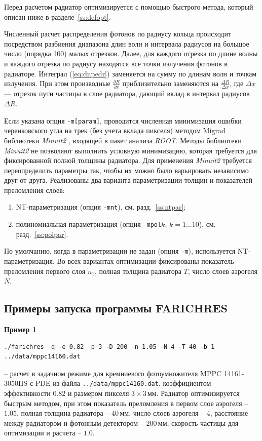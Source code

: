 \documentclass[12pt]{article}
\begin{document}
Перед расчетом радиатор оптимизируется с помощью быстрого метода, который описан ниже в разделе~\ref{ss:defopt}.

Численный расчет распределения фотонов по радиусу кольца происходит посредством разбиения диапазона длин волн и интервала 
радиусов на большое число (порядка 100) малых отрезков. Далее, для каждого отрезка по длине волны и каждого отрезка по радиусу находятся 
все точки излучения фотонов в радиаторе. Интеграл (\ref{eq:dnpedr}) заменяется на сумму по длинам волн и точкам излучения.
При этом производные $\frac{\partial R}{\partial x}$ приблизительно заменяются на $\frac{\Delta R}{\Delta x}$, где $\Delta x$ --- отрезок пути частицы в слое радиатора, дающий вклад в интервал радиусов $\Delta R$.

Если указана опция {\tt -m[param]}, проводится численная минимизация ошибки черенковского угла на трек (без учета вклада пикселя) 
методом Migrad библиотеки {\em Minuit2} \cite{minuit2}, входящей в пакет анализа {\em ROOT}. Методы библиотеки {\em Minuit2} не 
позволяют выполнить условную минимизацию, которая требуется для фиксированной полной толщины радиатора. 
Для применения {\em Minuit2} требуется переопределить параметры так, чтобы их можно было варьировать независимо друг от друга.
Реализованы два варианта параметризации толщин и показателей преломления слоев:
\begin{enumerate}
\item NT-параметризация (опция {\tt -mnt}), см. разд.~\ref{ss:ntpar};
\item полиномиальная параметризация (опция {\tt -mpol$k$}, $k=1\ldots 10$), см. разд.~\ref{ss:polpar}.
\end{enumerate}
По умолчанию, когда в параметризации не задан (опция {\tt -m}), используется NT-параметризация.
Во всех вариантах оптимизации фиксированы показатель преломления первого слоя $n_1$, полная толщина радиатора $T$, число слоев аэрогеля $N$.

\subsection{Примеры запуска программы FARICHRES}
\label{ss:examples}
\vspace*{5mm}
\textbf{Пример 1}
{\small
\begin{verbatim}
./farichres -q -e 0.82 -p 3 -D 200 -n 1.05 -N 4 -T 40 -b 1 ../data/mppc14160.dat
\end{verbatim}}
\noindent
-- расчет в задачном режиме для кремниевого фотоумножителя MPPC 14161-3050HS с PDE из файла \texttt{../data/mppc14160.dat},
коэффициентом эффективности $0.82$ и размером пикселя $3\times 3$\,мм. 
Радиатор оптимизируется быстрым методом, при этом показатель преломления в первом слое аэрогеля -- $1.05$, полная толщина радиатора -- $40$\,мм, число слоев аэрогеля -- 4, расстояние между радиатором и фотонным детектором -- $200$\,мм, скорость частицы для оптимизации и расчета -- $1.0$.\\[2mm]
\end{document}
